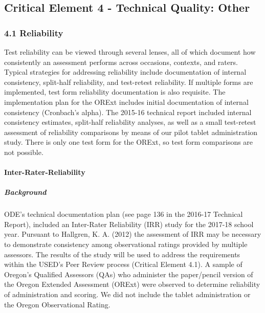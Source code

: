 \documentclass[]{article}
\title{}
\author{}
\date{}
\let\oldparagraph\paragraph
\renewcommand{\paragraph}[1]{\oldparagraph{#1}\mbox{}}
\let\oldsubparagraph\subparagraph
\renewcommand{\subparagraph}[1]{\oldsubparagraph{#1}\mbox{}}
\begin{document}
{
\setcounter{tocdepth}{5}
\tableofcontents
}
\hypertarget{critical-element-4---technical-quality-other}{%
\subsection{Critical Element 4 - Technical Quality:
Other}\label{critical-element-4---technical-quality-other}}

\hypertarget{reliability}{%
\subsubsection{4.1 Reliability}\label{reliability}}

Test reliability can be viewed through several lenses, all of which
document how consistently an assessment performs across occasions,
contexts, and raters. Typical strategies for addressing reliability
include documentation of internal consistency, split-half reliability,
and test-retest reliability. If multiple forms are implemented, test
form reliability documentation is also requisite. The implementation
plan for the ORExt includes initial documentation of internal
consistency (Cronbach's alpha). The 2015-16 technical report included
internal consistency estimates, split-half reliability analyses, as well
as a small test-retest assessment of reliability comparisons by means of
our pilot tablet administration study. There is only one test form for
the ORExt, so test form comparisons are not possible. \newpage

\hypertarget{inter-rater-reliability}{%
\paragraph{Inter-Rater-Reliability}\label{inter-rater-reliability}}

\hypertarget{background}{%
\subparagraph{Background}\label{background}}

ODE's technical documentation plan (see page 136 in the 2016-17
Technical Report), included an Inter-Rater Reliability (IRR) study for
the 2017-18 school year. Pursuant to Hallgren, K. A. (2012) the
assessment of IRR may be necessary to demonstrate consistency among
observational ratings provided by multiple assessors. The results of the
study will be used to address the requirements within the USED's Peer
Review process (Critical Element 4.1). A sample of Oregon's Qualified
Assessors (QAs) who administer the paper/pencil version of the Oregon
Extended Assessment (ORExt) were observed to determine reliability of
administration and scoring. We did not include the tablet administration
or the Oregon Observational Rating.
\end{document}
